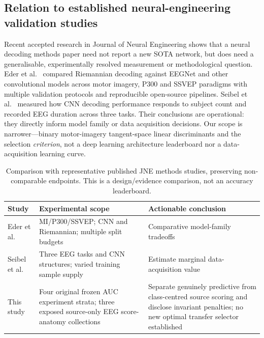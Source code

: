 \subsection{Relation to established neural-engineering validation studies}
\label{sec:p1-jne-peer}
Recent accepted research in Journal of Neural Engineering shows
that a neural decoding methods paper need not report a new SOTA
network, but does need a generalisable, experimentally resolved
measurement or methodological question.
Eder et al.\ \cite{eder2024jnebenchmark} compared Riemannian
decoding against EEGNet and other convolutional models
across motor imagery, P300 and SSVEP paradigms with multiple
validation protocols and reproducible open-source pipelines.
Seibel et al.\ \cite{seibel2026jnedata}
measured how CNN decoding performance responds to subject
count and recorded EEG duration across three tasks.
Their conclusions are operational: they directly inform
model family or data acquisition decisions.
Our scope is narrower---binary motor-imagery
tangent-space linear discriminants and the
selection \emph{criterion}, not a deep learning
architecture leaderboard nor a data-acquisition
learning curve.

\begin{table}[tb]
\centering\small
\caption{Comparison with representative published
JNE methods studies, preserving non-comparable
endpoints. This is a design/evidence comparison,
not an accuracy leaderboard.}
\label{tab:p1-jne-peer}
\setlength{\tabcolsep}{4pt}
\begin{tabular}{p{.24\linewidth}p{.31\linewidth}p{.33\linewidth}}
\toprule
Study & Experimental scope & Actionable conclusion\\
\midrule
Eder et al.\ \cite{eder2024jnebenchmark}
& MI/P300/SSVEP; CNN and Riemannian; multiple split budgets
& Comparative model-family tradeoffs\\
Seibel et al.\ \cite{seibel2026jnedata}
& Three EEG tasks and CNN structures; varied training sample supply
& Estimate marginal data-acquisition value\\
This study
& Four original frozen AUC experiment strata; three
  exposed source-only EEG score-anatomy collections
& Separate genuinely predictive from class-centred
  source scoring and disclose invariant penalties;
  no new optimal transfer selector established\\
\bottomrule
\end{tabular}
\end{table}

